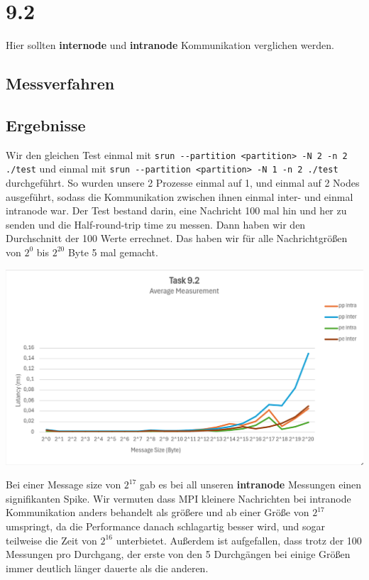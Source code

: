 \documentclass{report}
\begin{document}
\section*{9.2}
Hier sollten \textbf{internode} und \textbf{intranode} Kommunikation verglichen 
werden.
\subsection*{Messverfahren}

\subsection*{Ergebnisse}
Wir den gleichen Test einmal mit \newline
\verb|srun --partition <partition> -N 2 -n 2 ./test| \newline
und einmal mit \newline
\verb|srun --partition <partition> -N 1 -n 2 ./test| \newline
durchgeführt. So wurden unsere 2 Prozesse einmal auf 1, und einmal auf 2 Nodes 
ausgeführt, sodass die Kommunikation zwischen ihnen einmal inter- und
einmal intranode war. Der Test bestand darin, eine Nachricht 100 mal hin und 
her zu senden und die Half-round-trip time zu
messen. Dann haben wir den Durchschnitt der 100 Werte errechnet. Das haben wir 
für alle Nachrichtgrößen von \( 2^{0} \) bis \( 2^{20} \) Byte 5 mal gemacht.
\begin{center}
	\includegraphics[width=\textwidth]{Intra-Inter}
\end{center}
Bei einer Message size von \( 2^{17} \) gab es bei all unseren 
\textbf{intranode} Messungen einen signifikanten Spike. Wir vermuten dass MPI 
kleinere Nachrichten
bei intranode Kommunikation anders behandelt als größere und ab einer Größe von 
\( 2^{17} \) umspringt, da die Performance danach schlagartig besser wird, und
sogar teilweise die Zeit von \( 2^{16} \) unterbietet. \newline
Außerdem ist aufgefallen, dass trotz der 100 Messungen pro Durchgang, der erste 
von den 5 Durchgängen bei einige Größen immer deutlich länger
dauerte als die anderen.
\newpage
\end{document}

